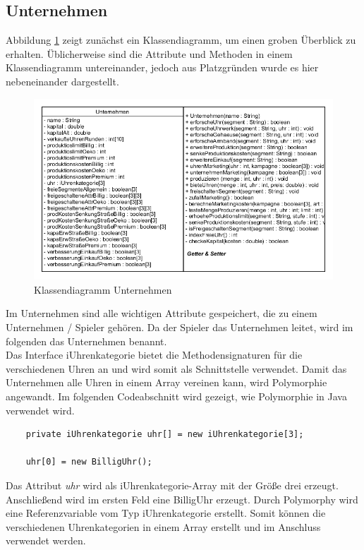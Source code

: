 \newpage
\subsection{Unternehmen}
Abbildung \ref{fig:abb2} zeigt zunächst ein Klassendiagramm, um einen groben Überblick zu erhalten. Üblicherweise sind die Attribute und Methoden in einem Klassendiagramm untereinander, jedoch aus Platzgründen wurde es hier nebeneinander dargestellt.

\begin{figure} [h]
	\centering
	\includegraphics[scale=0.6]{img/Unternehmen.png} 	
	\caption{Klassendiagramm Unternehmen} \label{fig:abb2}
\end{figure}

Im Unternehmen sind alle wichtigen Attribute gespeichert, die zu einem Unternehmen / Spieler gehören. Da der Spieler das Unternehmen leitet, wird im folgenden das Unternehmen benannt. \\

Das Interface iUhrenkategorie bietet die Methodensignaturen für die verschiedenen Uhren an und wird somit als Schnittstelle verwendet. Damit das Unternehmen alle Uhren in einem Array vereinen kann, wird Polymorphie angewandt. Im folgenden Codeabschnitt wird gezeigt, wie Polymorphie in Java verwendet wird. \\

\lstset{language=Java} 
\begin{lstlisting}
	private iUhrenkategorie uhr[] = new iUhrenkategorie[3];
	
	uhr[0] = new BilligUhr();
\end{lstlisting}

Das Attribut \textit{uhr} wird als iUhrenkategorie-Array mit der Größe drei erzeugt. Anschließend wird im ersten Feld eine BilligUhr erzeugt. Durch Polymorphy wird eine Referenzvariable vom Typ iUhrenkategorie erstellt. Somit können die verschiedenen Uhrenkategorien in einem Array erstellt und im Anschluss verwendet werden. 


